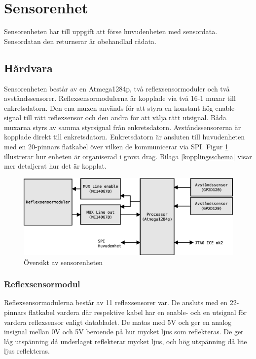 
\section{Sensorenhet}

Sensorenheten har till uppgift att förse huvudenheten med sensordata. Sensordatan den returnerar är obehandlad rådata.

\subsection{Hårdvara}

Sensorenheten består av en Atmega1284p, två reflexsensormoduler\cite{reflexsensormodul} och två avståndssensorer\cite{avstandssensor}. Reflexsensormodulerna är kopplade via två 16-1 muxar\cite{Muxar} till enkretsdatorn. Den ena muxen används för att styra en konstant hög enable-signal till rätt reflexsensor och den andra för att välja rätt utsignal. Båda muxarna styrs av samma styrsignal från enkretsdatorn. Avståndssensorerna är kopplade direkt till enkretsdatorn. Enkretsdatorn är ansluten till huvudenheten med en 20-pinnars flatkabel över vilken de kommunicerar via SPI. Figur \ref{sensor-oversikt} illustrerar hur enheten är organiserad i grova drag. Bilaga \ref{kopplingsschema} visar mer detaljerat hur det är kopplat.

\begin{figure}[h!]
	\centering
	\includegraphics[scale=0.4]{grafik/sensorenhet-oversikt}
	\caption{Översikt av sensorenheten} \label{sensor-oversikt}
\end{figure}

\subsubsection{Reflexsensormodul}
Reflexsensormodulerna består av 11 reflexsensorer var. De ansluts med en 22-pinnars flatkabel vardera där respektive kabel har en enable- och en utsignal för vardera reflexsensor enligt databladet\cite{reflexsensormodul}. De matas med 5V och ger en analog insignal mellan 0V och 5V beroende på hur mycket ljus som reflekteras. De ger låg utspänning då underlaget reflekterar mycket ljus, och hög utspänning då lite ljus reflekteras.

